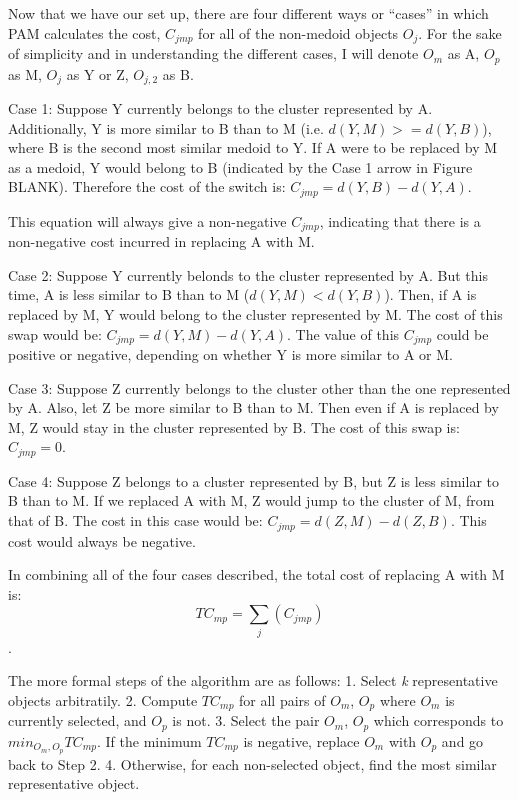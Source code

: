 \documentclass[12pt,twoside]{amherstthesis}
\begin{document}
  Now that we have our set up, there are four different ways or ``cases''
  in which PAM calculates the cost, \(C_{jmp}\) for all of the non-medoid
  objects \(O_j\). For the sake of simplicity and in understanding the
  different cases, I will denote \(O_m\) as A, \(O_p\) as M, \(O_j\) as Y
  or Z, \(O_{j,2}\) as B.
  
  Case 1: Suppose Y currently belongs to the cluster represented by A.
  Additionally, Y is more similar to B than to M (i.e.
  \(d(Y, M) >= d(Y, B)\)), where B is the second most similar medoid to Y.
  If A were to be replaced by M as a medoid, Y would belong to B
  (indicated by the Case 1 arrow in Figure BLANK). Therefore the cost of
  the switch is: \(C_{jmp} = d(Y, B) - d(Y, A)\).
  
  This equation will always give a non-negative \(C_{jmp}\), indicating
  that there is a non-negative cost incurred in replacing A with M.
  
  Case 2: Suppose Y currently belonds to the cluster represented by A. But
  this time, A is less similar to B than to M (\(d(Y, M) < d(Y, B)\)).
  Then, if A is replaced by M, Y would belong to the cluster represented
  by M. The cost of this swap would be: \(C_{jmp} = d(Y, M) - d(Y, A)\).
  The value of this \(C_{jmp}\) could be positive or negative, depending
  on whether Y is more similar to A or M.
  
  Case 3: Suppose Z currently belongs to the cluster other than the one
  represented by A. Also, let Z be more similar to B than to M. Then even
  if A is replaced by M, Z would stay in the cluster represented by B. The
  cost of this swap is: \(C_{jmp} = 0\).
  
  Case 4: Suppose Z belongs to a cluster represented by B, but Z is less
  similar to B than to M. If we replaced A with M, Z would jump to the
  cluster of M, from that of B. The cost in this case would be:
  \(C_{jmp} = d(Z, M) - d(Z, B)\). This cost would always be negative.
  
  In combining all of the four cases described, the total cost of
  replacing A with M is: \[ TC_{mp} = \sum_j(C_{jmp}) \].
  
  The more formal steps of the algorithm are as follows: 1. Select
  \emph{k} representative objects arbitratily. 2. Compute \(TC_{mp}\) for
  all pairs of \(O_m\), \(O_p\) where \(O_m\) is currently selected, and
  \(O_p\) is not. 3. Select the pair \(O_m\), \(O_p\) which corresponds to
  \(min_{O_m, O_p} TC_{mp}\). If the minimum \(TC_{mp}\) is negative,
  replace \(O_m\) with \(O_p\) and go back to Step 2. 4. Otherwise, for
  each non-selected object, find the most similar representative object.
  
\end{document}

